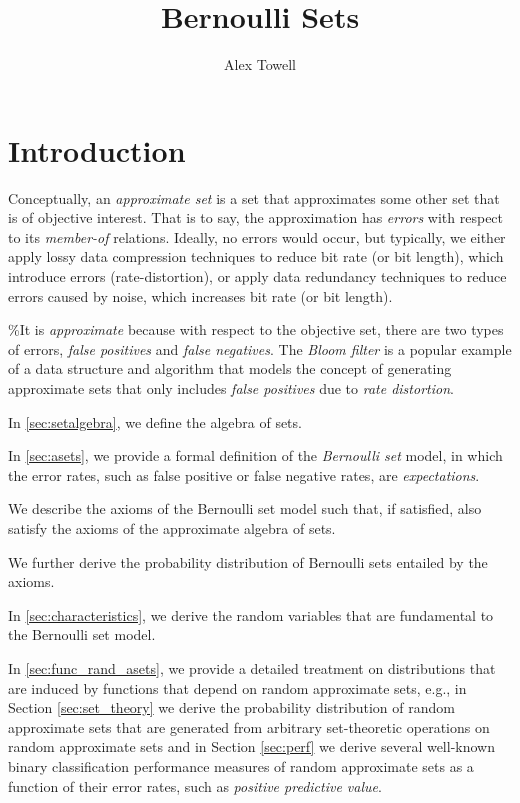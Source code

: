 \documentclass[
]{article}
\title{Bernoulli Sets}
\author{Alex Towell}
\date{}
\begin{document}
\maketitle

{
\setcounter{tocdepth}{2}
\tableofcontents
}
\newtheorem{definition}{Definition}
\newcommand{\FN}{\operatorname{FN}}
\newcommand{\TN}{\operatorname{TN}}
\newcommand{\FP}{\operatorname{FP}}
\newcommand{\TP}{\operatorname{TP}}
\newcommand{\ERR}{\Delta}

\hypertarget{introduction}{%
\section{Introduction}\label{introduction}}

Conceptually, an \emph{approximate set} is a set that approximates some
other set that is of objective interest. That is to say, the
approximation has \emph{errors} with respect to its \emph{member-of}
relations. Ideally, no errors would occur, but typically, we either
apply lossy data compression techniques to reduce bit rate (or bit
length), which introduce errors (rate-distortion), or apply data
redundancy techniques to reduce errors caused by noise, which increases
bit rate (or bit length).

\%It is \emph{approximate} because with respect to the objective set,
there are two types of errors, \emph{false positives} and \emph{false
negatives}. The \emph{Bloom filter} is a popular example of a data
structure and algorithm that models the concept of generating
approximate sets that only includes \emph{false positives} due to
\emph{rate distortion}.

In \ref{sec:setalgebra}, we define the algebra of sets.

In \ref{sec:asets}, we provide a formal definition of the
\emph{Bernoulli set} model, in which the error rates, such as false
positive or false negative rates, are \emph{expectations}.

We describe the axioms of the Bernoulli set model such that, if
satisfied, also satisfy the axioms of the approximate algebra of sets.

We further derive the probability distribution of Bernoulli sets
entailed by the axioms.

In \ref{sec:characteristics}, we derive the random variables that are
fundamental to the Bernoulli set model.

In \ref{sec:func_rand_asets}, we provide a detailed treatment on
distributions that are induced by functions that depend on random
approximate sets, e.g., in Section \ref{sec:set_theory} we derive the
probability distribution of random approximate sets that are generated
from arbitrary set-theoretic operations on random approximate sets and
in Section \ref{sec:perf} we derive several well-known binary
classification performance measures of random approximate sets as a
function of their error rates, such as \emph{positive predictive value}.
\end{document}
